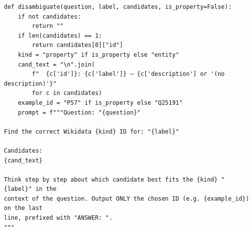 \begin{lstlisting}[caption={Disambiguation prompt, as built by the pipeline. The candidate list is injected at \texttt{\{cand\_text\}}. The reported runs send this prompt through Anthropic's batch interface or, for the open models, through vLLM. If the answer contains no identifier, or a request fails, the first search result is used instead; in the reported frontier-model runs all 4,063 requests returned an answer line, so this fallback was never used.},label={lst:prompt-disamb},basicstyle=\ttfamily\scriptsize,breaklines=true,captionpos=b]
def disambiguate(question, label, candidates, is_property=False):
    if not candidates:
        return ""
    if len(candidates) == 1:
        return candidates[0]["id"]
    kind = "property" if is_property else "entity"
    cand_text = "\n".join(
        f"  {c['id']}: {c['label']} — {c['description'] or '(no description)'}"
        for c in candidates)
    example_id = "P57" if is_property else "Q25191"
    prompt = f"""Question: "{question}"

Find the correct Wikidata {kind} ID for: "{label}"

Candidates:
{cand_text}

Think step by step about which candidate best fits the {kind} "{label}" in the
context of the question. Output ONLY the chosen ID (e.g. {example_id}) on the last
line, prefixed with "ANSWER: ".
"""
\end{lstlisting}
